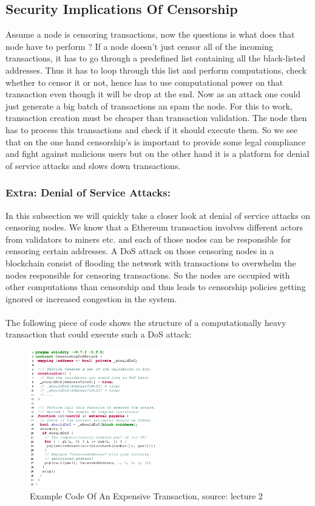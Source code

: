 \documentclass{article}
\begin{document}
\subsection{Security Implications Of Censorship}
Assume a node is censoring transactions, now the questions is what does that node have to perform ? If a node doesn't just censor all of the incoming transactions, it has to go through a predefined list containing all the black-listed addresses. Thus it has to loop through this list and perform computations, check whether to censor it or not, hence has to use computational power on that transaction even though it will be drop at the end. Now as an attack one could just generate a big batch of transactions an spam the node. For this to work, transaction creation must be cheaper than transaction validation. The node then has to process this transactions and check if it should execute them. So we see that on the one hand censorship's is important to provide some legal compliance and fight against malicious users but on the other hand it is a platform for denial of service attacks and slows down transactions.
\subsubsection{Extra: Denial of Service Attacks:}
In this subsection we will quickly take a closer look at denial of service attacks on censoring nodes. We know that a Ethereum transaction involves different actors from validators to miners etc. and each of those nodes can be responsible for censoring certain addresses. A DoS attack on those censoring nodes in a blockchain consist of flooding the network with transactions to overwhelm the nodes responsible for censoring transactions. So the nodes are occupied with other computations than censorship and thus leads to censorship policies getting ignored or increased congestion in the system.\\\\The following piece of code shows the structure of a computationally heavy transaction that could execute such a DoS attack:

\begin{figure}[h]
    \centering
    \includegraphics[width=0.5\textwidth]{dos-attack.png} 
    \caption{Example Code Of An Expensive Transaction, \scriptsize{source: lecture 2}}
    \label{fig:DoS-attack}
\end{figure}
\end{document}
